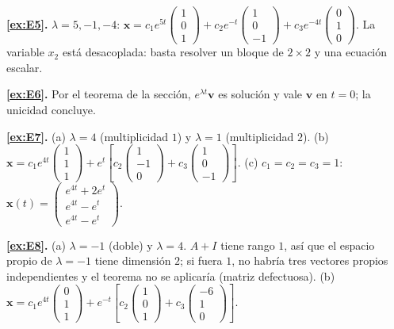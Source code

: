 \noindent\textbf{\ref{ex:E5}.} $\lambda = 5, -1, -4$: \; $\mathbf{x} = c_1e^{5t}\begin{pmatrix}1\\0\\1\end{pmatrix} + c_2e^{-t}\begin{pmatrix}1\\0\\-1\end{pmatrix} + c_3e^{-4t}\begin{pmatrix}0\\1\\0\end{pmatrix}$. La variable $x_2$ está desacoplada: basta resolver un bloque de $2\times 2$ y una ecuación escalar.

\noindent\textbf{\ref{ex:E6}.} Por el teorema de la sección, $e^{\lambda t}\mathbf{v}$ es solución y vale $\mathbf{v}$ en $t = 0$; la unicidad concluye.

\noindent\textbf{\ref{ex:E7}.} (a) $\lambda = 4$ (multiplicidad $1$) y $\lambda = 1$ (multiplicidad $2$). (b) $\mathbf{x} = c_1e^{4t}\begin{pmatrix}1\\1\\1\end{pmatrix} + e^{t}\left[c_2\begin{pmatrix}1\\-1\\0\end{pmatrix} + c_3\begin{pmatrix}1\\0\\-1\end{pmatrix}\right]$. (c) $c_1 = c_2 = c_3 = 1$: \; $\mathbf{x}(t) = \begin{pmatrix} e^{4t} + 2e^{t}\\ e^{4t} - e^{t}\\ e^{4t} - e^{t}\end{pmatrix}$.

\noindent\textbf{\ref{ex:E8}.} (a) $\lambda = -1$ (doble) y $\lambda = 4$. $A + I$ tiene rango $1$, así que el espacio propio de $\lambda=-1$ tiene dimensión $2$; si fuera $1$, no habría tres vectores propios independientes y el teorema no se aplicaría (matriz defectuosa). (b) $\mathbf{x} = c_1e^{4t}\begin{pmatrix}0\\1\\1\end{pmatrix} + e^{-t}\left[c_2\begin{pmatrix}1\\0\\1\end{pmatrix} + c_3\begin{pmatrix}-6\\1\\0\end{pmatrix}\right]$.

